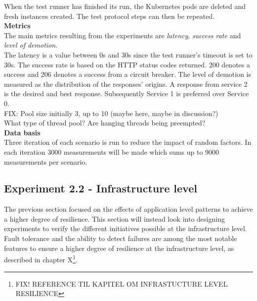 \noindent
When the test runner has finished its run, the Kubernetes pods are deleted and fresh instances created. The test protocol steps can then be repeated.\\

\noindent
\textbf{Metrics} \\
The main metrics resulting from the experiments are \textit{latency}, \textit{success rate} and \textit{level of demotion}.\\

\noindent
The latency is a value between 0s and 30s since the test runner's timeout is set to 30s. The success rate is based on the HTTP status codes returned. 200 denotes a success and 206 denotes a success from a circuit breaker. The level of demotion is measured as the distribution of the responses' origins. A response from service 2 is the desired and best response. Subsequently Service 1 is preferred over Service 0. \\

\noindent FIX: Pool size initially 3, up to 10 (maybe here, maybe in discussion?)
\\ What type of thread pool? Are hanging threads being preempted? \\

\noindent
\textbf{Data basis}
\\
Three iteration of each scenario is run to reduce the impact of random factors. In each iteration 3000 measurements will be made which sums up to 9000 measurements per scenario.

%

\subsection*{Experiment 2.2 - Infrastructure level}
\label{sec:experiment_infrastructure_level}
The previous section focused on the effects of application level patterns to achieve a higher degree of resilience. This section will instead look into designing experiments to verify the different initiatives possible at the infrastructure level. Fault tolerance and the ability to detect failures are among the most notable features to ensure a higher degree of resilience at the infrastructure level, as described in chapter X\footnote{FIX! REFERENCE TIL KAPITEL OM INFRASTUCTURE LEVEL RESILIENCE}.

